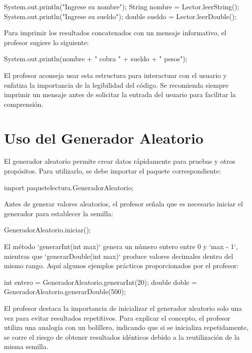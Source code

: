 \documentclass[a4paper]{report}
\begin{document}
\begin{roundedlst}
System.out.println("Ingrese su nombre");
String nombre = Lector.leerString();
System.out.println("Ingrese su sueldo");
double sueldo = Lector.leerDouble();
\end{roundedlst}

Para imprimir los resultados concatenados con un mensaje informativo, el profesor sugiere lo siguiente:

\begin{roundedlst}
System.out.println(nombre + " cobra " + sueldo + " pesos");
\end{roundedlst}

El profesor aconseja usar esta estructura para interactuar con el usuario y enfatiza la importancia de la legibilidad del código. Se recomienda siempre imprimir un mensaje antes de solicitar la entrada del usuario para facilitar la comprensión.

\section{Uso del Generador Aleatorio}

El generador aleatorio permite crear datos rápidamente para pruebas y otros propósitos. Para utilizarlo, se debe importar el paquete correspondiente:

\begin{roundedlst}
import paquetelectura.GeneradorAleatorio;
\end{roundedlst}

Antes de generar valores aleatorios, el profesor señala que es necesario iniciar el generador para establecer la semilla:

\begin{roundedlst}
GeneradorAleatorio.iniciar();
\end{roundedlst}

El método `generarInt(int max)` genera un número entero entre 0 y `max - 1`, mientras que `generarDouble(int max)` produce valores decimales dentro del mismo rango. Aquí algunos ejemplos prácticos proporcionados por el profesor:

\begin{roundedlst}
int entero = GeneradorAleatorio.generarInt(20);
double doble = GeneradorAleatorio.generarDouble(500);
\end{roundedlst}

El profesor destaca la importancia de inicializar el generador aleatorio solo una vez para evitar resultados repetitivos. Para explicar el concepto, el profesor utiliza una analogía con un bolillero, indicando que si se inicializa repetidamente, se corre el riesgo de obtener resultados idénticos debido a la reutilización de la misma semilla.
\end{document}
